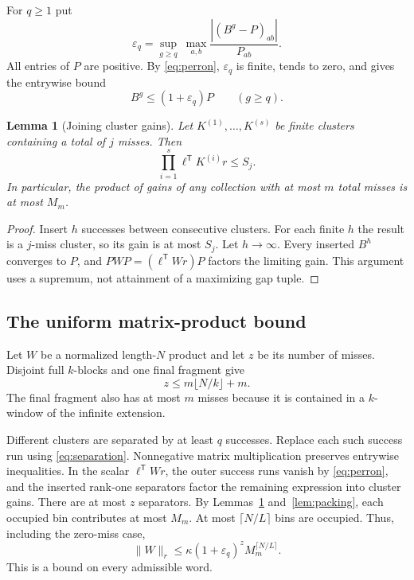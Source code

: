 \documentclass[11pt,letterpaper]{article}
\newtheorem{lemma}[theorem]{Lemma}
\theoremstyle{remark}
\newcommand{\transpose}{^{\mathsf T}}
\begin{document}
For $q\ge1$ put
\begin{equation}\label{eq:tail}
 \varepsilon_q=\sup_{g\ge q}\ 
  \max_{a,b}\frac{|(B^g-P)_{ab}|}{P_{ab}}.
\end{equation}
All entries of $P$ are positive. By \eqref{eq:perron},
$\varepsilon_q$ is finite, tends to zero, and gives the entrywise bound
\begin{equation}\label{eq:separation}
 B^g\le(1+\varepsilon_q)P\qquad(g\ge q).
\end{equation}

\begin{lemma}[Joining cluster gains]\label{lem:joining}
Let $K^{(1)},\ldots,K^{(s)}$ be finite clusters containing a total of $j$
misses. Then
\[
 \prod_{i=1}^s\ell\transpose K^{(i)}r\le S_j.
\]
In particular, the product of gains of any collection with at most $m$
total misses is at most $M_m$.
\end{lemma}
\begin{proof}
Insert $h$ successes between consecutive clusters. For each finite $h$
the result is a $j$-miss cluster, so its gain is at most $S_j$.
Let $h\to\infty$. Every inserted $B^h$ converges to $P$, and
$PWP=(\ell\transpose Wr)P$ factors the limiting gain.
This argument uses a supremum, not attainment of a maximizing gap tuple.
\end{proof}

\subsection{The uniform matrix-product bound}


Let $W$ be a normalized length-$N$ product and let $z$ be its number of
misses. Disjoint full $k$-blocks and one final fragment give
\begin{equation}\label{eq:count}
 z\le m\lfloor N/k\rfloor+m.
\end{equation}
The final fragment also has at most $m$ misses because it is contained
in a $k$-window of the infinite extension.

Different clusters are separated by at least $q$ successes. Replace
each such success run using \eqref{eq:separation}. Nonnegative matrix
multiplication preserves entrywise inequalities. In the scalar
$\ell\transpose Wr$, the outer success runs vanish by
\eqref{eq:perron}, and the inserted rank-one separators factor the
remaining expression into cluster gains. There are at most $z$
separators. By Lemmas~\ref{lem:joining} and~\ref{lem:packing}, each
occupied bin contributes at most $M_m$. At most $\lceil N/L\rceil$ bins
are occupied. Thus, including the zero-miss case,
\begin{equation}\label{eq:word-upper}
 \|W\|_r\le\kappa(1+\varepsilon_q)^z M_m^{\lceil N/L\rceil}.
\end{equation}
This is a bound on every admissible word.
\end{document}
